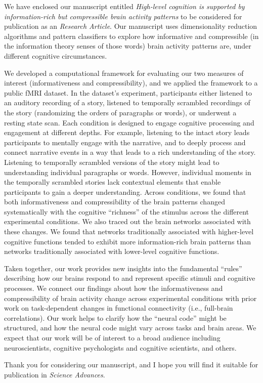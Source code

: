 \documentclass[10pt,stdletter,orderfromtodate,sigleft]{newlfm}
\newcommand{\journal}{Science Advances}
\newcommand{\articletype}{Research Article}
\newcommand{\myTitle}{High-level cognition is supported by information-rich but compressible brain activity patterns}
\begin{document}
\begin{newlfm}

  We have enclosed our manuscript entitled \textit{\myTitle} to be considered
  for publication as an \textit{\articletype}. Our manuscript uses
  dimensionality reduction algorithms and pattern classifiers to explore how
  informative and compressible (in the information theory senses of those
  words) brain activity patterns are, under different cognitive circumstances.

  We developed a computational framework for evaluating our two measures of
  interest (informativeness and compressibility), and we applied the framework
  to a public fMRI dataset. In the dataset's experiment, participants either
  listened to an auditory recording of a story, listened to temporally
  scrambled recordings of the story (randomizing the orders of paragraphs or
  words), or underwent a resting state scan. Each condition is designed to
  engage cognitive processing and engagement at different depths. For example,
  listening to the intact story leads participants to mentally engage with the
  narrative, and to deeply process and connect narrative events in a way that
  leads to a rich understanding of the story. Listening to temporally scrambled
  versions of the story might lead to understanding individual paragraphs or
  words. However, individual moments in the temporally scrambled stories lack
  contextual elements that enable participants to gain a deeper understanding.
  Across conditions, we found that both informativeness and compressibility of
  the brain patterns changed systematically with the cognitive ``richness'' of
  the stimulus across the different experimental conditions. We also traced out
  the brain networks associated with these changes. We found that networks
  traditionally associated with higher-level cognitive functions tended to
  exhibit more information-rich brain patterns than networks traditionally
  associated with lower-level cognitive functions.

  Taken together, our work provides new insights into the fundamental ``rules''
  describing how our brains respond to and represent specific stimuli and
  cognitive processes. We connect our findings about how the informativeness
  and compressibility of brain activity change across experimental conditions
  with prior work on task-dependent changes in functional connectivity (i.e.,
  full-brain correlations). Our work helps to clarify how the ``neural code''
  might be structured, and how the neural code might vary across tasks and
  brain areas. We expect that our work will be of interest to a broad audience
  including neuroscientists, cognitive psychologists and cognitive scientists,
  and others.


Thank you for considering our manuscript, and I hope you will find it suitable
for publication in \textit{\journal}.


\end{newlfm}
\end{document}
